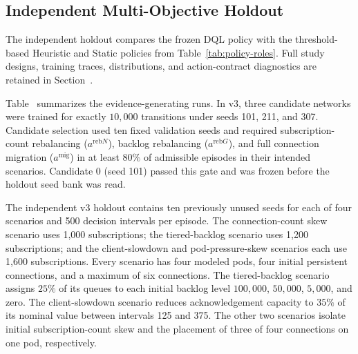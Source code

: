 \subsection{Independent Multi-Objective Holdout}
The independent holdout compares the frozen DQL policy with the threshold-based
Heuristic and Static policies from Table~\ref{tab:policy-roles}. Full study
designs, training traces, distributions, and action-contract diagnostics are
retained in Section~.

Table~ summarizes the evidence-generating runs.
In v3, three candidate networks were trained for exactly $10{,}000$
transitions under seeds 101, 211, and 307.  Candidate selection used ten fixed
validation seeds and required subscription-count rebalancing
($a^{\mathrm{reb}N}$), backlog rebalancing ($a^{\mathrm{reb}G}$), and full
connection migration ($a^{\mathrm{mig}}$) in at least $80\%$ of admissible
episodes in their intended scenarios.  Candidate 0 (seed 101) passed this gate
and was frozen before the holdout seed bank was read.

The independent v3 holdout contains ten previously unused seeds for each of
four scenarios and 500 decision intervals per episode.  The connection-count
skew scenario uses 1,000 subscriptions; the tiered-backlog scenario uses 1,200
subscriptions; and the client-slowdown and pod-pressure-skew scenarios each use
1,600 subscriptions.  Every scenario has four modeled pods, four initial
persistent connections, and a maximum of six connections.  The tiered-backlog
scenario assigns $25\%$ of its queues to each initial backlog level
$100{,}000$, $50{,}000$, $5{,}000$, and zero.  The client-slowdown scenario
reduces acknowledgement capacity to $35\%$ of its nominal value between
intervals 125 and 375.  The other two scenarios isolate initial
subscription-count skew and the placement of three of four connections on one
pod, respectively.

